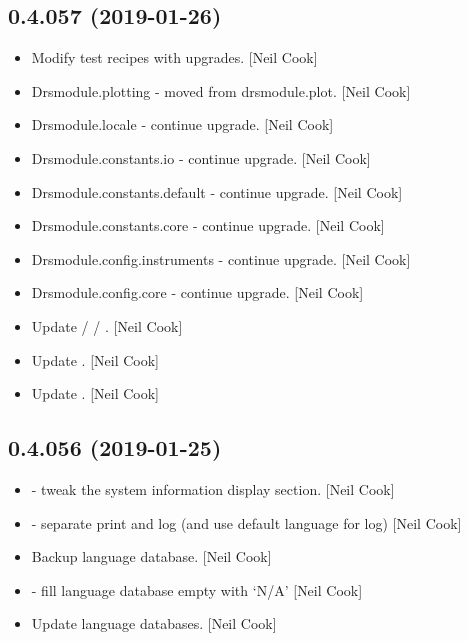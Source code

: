 \documentclass[a4paper,10pt,english]{report}
\begin{document}
\subsection{0.4.057 (2019-01-26)}
\label{\detokenize{misc/changelog:id206}}\begin{itemize}
\item {} 
Modify test recipes with upgrades. {[}Neil Cook{]}

\item {} 
Drsmodule.plotting - moved from drsmodule.plot. {[}Neil Cook{]}

\item {} 
Drsmodule.locale - continue upgrade. {[}Neil Cook{]}

\item {} 
Drsmodule.constants.io - continue upgrade. {[}Neil Cook{]}

\item {} 
Drsmodule.constants.default - continue upgrade. {[}Neil Cook{]}

\item {} 
Drsmodule.constants.core - continue upgrade. {[}Neil Cook{]}

\item {} 
Drsmodule.config.instruments - continue upgrade. {[}Neil Cook{]}

\item {} 
Drsmodule.config.core - continue upgrade. {[}Neil Cook{]}

\item {} 
Update  /  / . {[}Neil Cook{]}

\item {} 
Update . {[}Neil Cook{]}

\item {} 
Update . {[}Neil Cook{]}

\end{itemize}


\subsection{0.4.056 (2019-01-25)}
\label{\detokenize{misc/changelog:id207}}\begin{itemize}
\item {} 
 - tweak the system information display section. {[}Neil
Cook{]}

\item {} 
 - separate print and log (and use default language for log)
{[}Neil Cook{]}

\item {} 
Backup language database. {[}Neil Cook{]}

\item {} 
 - fill language database empty with ‘N/A’ {[}Neil Cook{]}

\item {} 
Update language databases. {[}Neil Cook{]}

\end{itemize}
\end{document}
